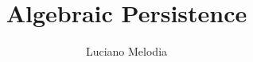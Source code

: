 
\title{Algebraic Persistence}
\author{Luciano Melodia}
\newcommand{\subtitle}{Persistent Homology Theory}
\newcommand{\universityfaculty}{Faculty of Natural Sciences}
\newcommand{\doctoraldegree}{Bachelor of Science (B.Sc.)}
\newcommand{\homecityofphd}{Erlangen}
\newcommand{\homecountryofphd}{Deutschland}
\newcommand{\dateofdefense}{\today}
\newcommand{\deanofdepartment}{Prof. Dr. Catherine Meusburger}
\newcommand{\firstreviewer}{Prof. Dr. Kang Li}
\newcommand{\secondreviewer}{Prof. Dr. Catherine Meusburger}